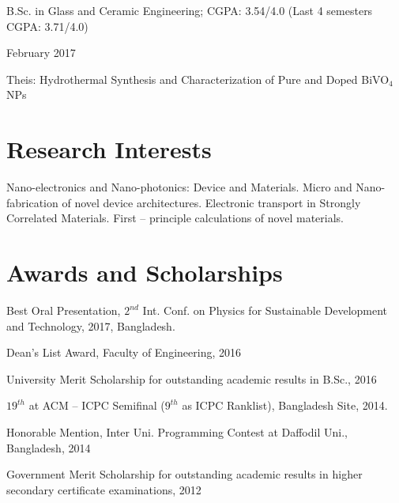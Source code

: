 \documentclass[a4paper,20pt]{article}
\begin{document}
   		\begin{minipage}{.80\linewidth} \begin{flushleft}
    		B.Sc. in Glass and Ceramic Engineering;  CGPA: 3.54/4.0 (Last 4 semesters CGPA: 3.71/4.0)\\
    	\end{flushleft} \end{minipage}
    \hfill 
    \begin{minipage}{.15\linewidth}\begin{flushright}
    	 February 2017
    	\end{flushright}\end{minipage}
	 Theis: Hydrothermal Synthesis and Characterization of Pure and Doped BiVO$_{4}$ NPs\\
	 
\vspace{0pt}
\section{Research Interests}
	Nano-electronics and Nano-photonics: Device and Materials. Micro and Nano-fabrication of novel device architectures. Electronic transport in Strongly Correlated Materials. First – principle calculations of novel materials.\\

\vspace{0pt}
\section{Awards and Scholarships}
	\begin{description}[font=$\bullet$]
		\item{Best Oral Presentation, $2^{nd}$ Int. Conf. on Physics for Sustainable Development and Technology, 2017, Bangladesh.}
		\vspace{-5pt}
		\item {Dean's List Award, Faculty of Engineering, 2016}
		\vspace{-5pt}
		\item {University Merit Scholarship for outstanding academic results in B.Sc., 2016}
		\vspace{-5pt}
		\item {$19^{th}$ at ACM – ICPC Semifinal ($9^{th}$ as ICPC Ranklist), Bangladesh Site, 2014.}
		\vspace{-5pt}
		\item {Honorable Mention, Inter Uni. Programming Contest at Daffodil Uni., Bangladesh, 2014}
		\vspace{-5pt}
		\item {Government Merit Scholarship for outstanding academic results in higher secondary certificate examinations, 2012}
\end{description}
\end{document}
